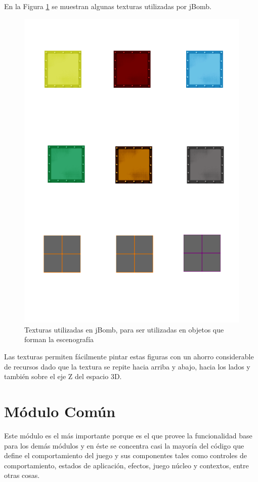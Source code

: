 \documentclass[a4paper,12pt,openany,oneside]{book}
\begin{document}
En la Figura \ref{textureslabel} se muestran algunas texturas utilizadas por jBomb.
\begin{figure}
\begin{center}
\includegraphics[scale=0.7]{textures.pdf} 
\end{center}
\caption[Utilización de texturas en jBomb]{Texturas utilizadas en jBomb, para ser utilizadas en objetos que forman la escenografía}\label{textureslabel}
\end{figure}

Las texturas permiten fácilmente pintar estas figuras con un ahorro considerable de recursos dado que la textura se repite hacia arriba y abajo, hacia los lados y también sobre el eje Z del espacio 3D.
\section{Módulo Común}
Este módulo es el más importante porque es el que provee la funcionalidad base para los demás módulos y en éste se concentra casi la mayoría del código que define el comportamiento del juego y sus componentes tales como controles de comportamiento, estados de aplicación, efectos, juego núcleo y contextos, entre otras cosas.
\end{document}
